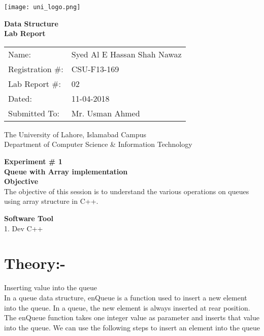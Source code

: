 \documentclass[11pt]{article}            %
\begin{document}
\begin{titlepage}
    \centering
  \vfill
    \texttt{[image: uni\_logo.png]} \\ 
	\vskip2cm
    {\bfseries\Large
	Data Structure \\ 
	
	\vskip2cm
	Lab Report 
	 
	\vskip2cm
	}    

\begin{center}
\begin{tabular}{ l l  } 

Name: & Syed Al E Hassan Shah Nawaz \\ 
Registration \#:& CSU-F13-169 \\ 
Lab Report \#: & 02 \\ 
 Dated:& 11-04-2018\\ 
Submitted To:& Mr. Usman Ahmed\\ 

\end{tabular}
\end{center}
    \vfill
    The University of Lahore, Islamabad Campus\\
Department of Computer Science \& Information Technology
\end{titlepage}


    
    {\bfseries\Large
\centering
	Experiment \# 1 \\

Queue with Array implementation\\
	
	}    
 \vskip1cm
 \textbf {Objective}\\  The objective of this session is to understand the various operations on queues using array structure in C++. 
 
 \textbf {Software Tool} \\
1. Dev C++ \\
\section{Theory:-} 
{Inserting value into the queue}\\

In a queue data structure, enQueue is a function used to insert a new element into the queue. In a queue, the new element is always inserted at rear position. The enQueue function takes one integer value as parameter and inserts that value into the queue. We can use the following steps to insert an element into the queue
\end{document}
